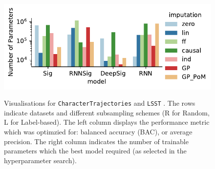 \documentclass{article}
\begin{document}
\begin{figure}[tbp]
{    \includegraphics[width=0.48\linewidth]{plots/barplot_main_params_LSST-MissingAtRandomSubsampler.pdf}%
  }\\%
  \caption{%
    Visualisations for \texttt{CharacterTrajectories} and \texttt{LSST} . The rows indicate datasets and different subsampling schemes (R for Random, L for Label-based). The left column displays the performance metric which was optimzied for: balanced accuracy (BAC), or average precision. The right column indicates the number of trainable parameters which the best model required (as selected in the hyperparameter search).
  }
  \label{supp: barplots1}
\end{figure}
\end{document}
